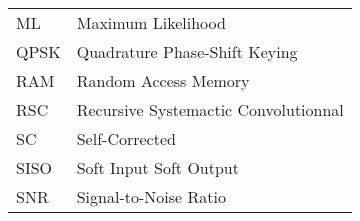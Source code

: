 \begin{center}
\begin{longtable}{ p{}  p{} }
ML          & Maximum Likelihood                                                                     \\
QPSK        & Quadrature Phase-Shift Keying                                                          \\
RAM         & Random Access Memory                                                                   \\
RSC         & Recursive Systemactic Convolutionnal                                                   \\
SC          & Self-Corrected                                                                         \\
SISO        & Soft Input Soft Output                                                                 \\
SNR         & Signal-to-Noise Ratio                                                                  \\
\end{longtable}
\end{center}

